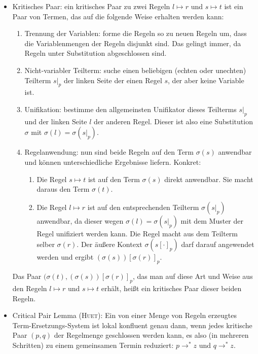 \documentclass[
  a4paper,
  11pt,
]{scrartcl}
\begin{document}
\begin{itemize}
  \item Kritisches Paar: ein kritisches Paar zu zwei Regeln $l \mapsto r$ und $s
    \mapsto t$ ist ein Paar von Termen, das auf die folgende Weise erhalten
    werden kann:
    \begin{enumerate}
      \item Trennung der Variablen: forme die Regeln so zu neuen Regeln um, dass
        die Variablenmengen der Regeln disjunkt sind. Das gelingt immer, da
        Regeln unter Substitution abgeschlossen sind.

      \item Nicht-variabler Teilterm: suche einen beliebigen (echten oder
        unechten) Teilterm ${s|}_p$ der linken Seite der einen Regel $s$, der
        aber keine Variable ist.

      \item Unifikation: bestimme den allgemeinsten Unifikator dieses Teilterms
        ${s|}_p$ und der linken Seite $l$ der anderen Regel. Dieser ist also
        eine Substitution $\sigma$ mit $\sigma(l) = \sigma({s|}_p)$.

      \item Regelanwendung: nun sind beide Regeln auf den Term $\sigma(s)$
        anwendbar und können unterschiedliche Ergebnisse liefern. Konkret:
        \begin{enumerate}
          \item Die Regel $s \mapsto t$ ist auf den Term $\sigma(s)$ direkt
            anwendbar. Sie macht daraus den Term $\sigma(t)$.

          \item Die Regel $l \mapsto r$ ist auf den entsprechenden Teilterm
            $\sigma({s|}_p)$ anwendbar, da dieser wegen $\sigma(l) =
            \sigma({s|}_p)$ mit dem Muster der Regel unifiziert werden kann. Die
            Regel macht aus dem Teilterm selber $\sigma(r)$. Der äußere Kontext
            $\sigma({s[\cdot]}_p)$ darf darauf angewendet werden und ergibt
            $(\sigma(s)){[\sigma(r)]}_p$.
        \end{enumerate}
    \end{enumerate}

    Das Paar $(\sigma(t), (\sigma(s)){[\sigma(r)]}_p$, das man auf diese Art und
    Weise aus den Regeln $l \mapsto r$ und $s \mapsto t$ erhält, heißt ein
    kritisches Paar dieser beiden Regeln.

  \item Critical Pair Lemma (\textsc{Huet}): Ein von einer Menge von Regeln
    erzeugtes Term-Ersetzungs-System ist lokal konfluent genau dann, wenn jedes
    kritische Paar $(p, q)$ der Regelmenge geschlossen werden kann, es also (in
    mehreren Schritten) zu einem gemeinsamen Termin reduziert: $p \rightarrow^*
    z$ und $q \rightarrow^* z$.


\end{itemize}
\end{document}

